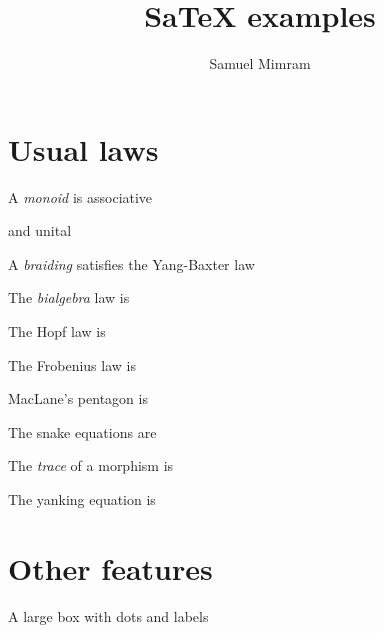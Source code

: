 \documentclass[a4paper]{article}
\title{SaTeX examples}
\author{Samuel Mimram}
\newcommand{\ex}[1]{}
\begin{document}
\maketitle

\section{Usual laws}
A \emph{monoid} is associative
\ex{mon-assoc}
and unital
\ex{mon-unit}

A \emph{braiding} satisfies the Yang-Baxter law
\ex{braiding}

The \emph{bialgebra} law is
\ex{bialgebra}

The Hopf law is
\ex{hopf}

The Frobenius law is
\ex{frobenius}

MacLane's pentagon is
\ex{pentagon}

The snake equations are
\ex{snake}

The \emph{trace} of a morphism is
\ex{trace}

The yanking equation is
\ex{yanking}

\section{Other features}
A large box with dots and labels
\ex{box}
\end{document}
